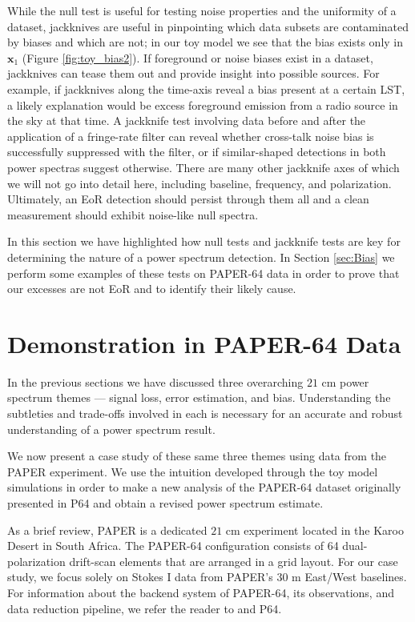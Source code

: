 \documentclass[preprint2,numberedappendix,tighten]{aastex6}  %
\begin{document}
While the null test is useful for testing noise properties and the uniformity of a dataset, jackknives are useful in pinpointing which data subsets are contaminated by biases and which are not; in our toy model we see that the bias exists only in $\textbf{x}_{1}$ (Figure \ref{fig:toy_bias2}). If foreground or noise biases exist in a dataset, jackknives can tease them out and provide insight into possible sources. For example, if jackknives along the time-axis reveal a bias present at a certain LST, a likely explanation would be excess foreground emission from a radio source in the sky at that time. A jackknife test involving data before and after the application of a fringe-rate filter can reveal whether cross-talk noise bias is successfully suppressed with the filter, or if similar-shaped detections in both power spectras suggest otherwise. There are many other jackknife axes of which we will not go into detail here, including baseline, frequency, and polarization. Ultimately, an EoR detection should persist through them all and a clean measurement should exhibit noise-like null spectra.

In this section we have highlighted how null tests and jackknife tests are key for determining the nature of a power spectrum detection. In Section \ref{sec:Bias} we perform some examples of these tests on PAPER-64 data in order to prove that our excesses are not EoR and to identify their likely cause. 


\section{Demonstration in PAPER-64 Data}
\label{sec:CaseStudy}

In the previous sections we have discussed three overarching $21$ cm power spectrum themes --- signal loss, error estimation, and bias. Understanding the subtleties and trade-offs involved in each is necessary for an accurate and robust understanding of a power spectrum result. 

We now present a case study of these same three themes using data from the PAPER experiment. We use the intuition developed through the toy model simulations in order to make a new analysis of the PAPER-64 dataset originally presented in P64 and obtain a revised power spectrum estimate.

As a brief review, PAPER is a dedicated $21$ cm experiment located in the Karoo Desert in South Africa. The PAPER-64 configuration consists of 64 dual-polarization drift-scan elements that are arranged in a grid layout. For our case study, we focus solely on Stokes I data from PAPER's $30$ m East/West baselines. For information about the backend system of PAPER-64, its observations, and data reduction pipeline, we refer the reader to \citet{parsons_et_al2010} and P64.
\end{document}
